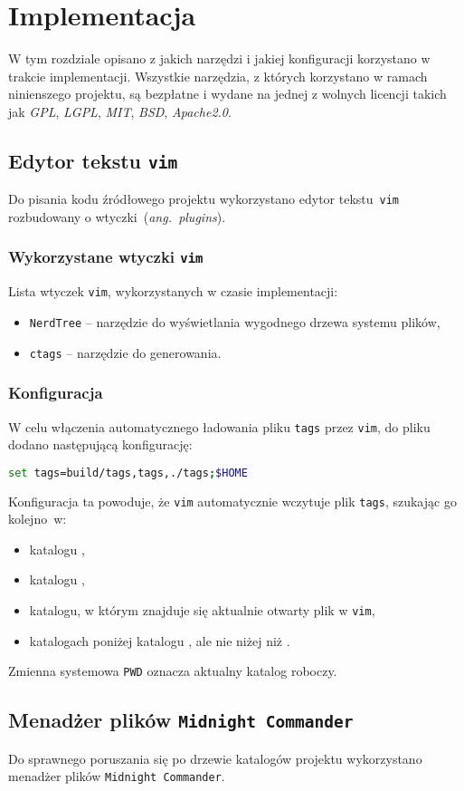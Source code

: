 \documentclass[praca_magisterska]{subfiles}
\begin{document}
\chapter{Implementacja}

W tym rozdziale opisano z jakich narzędzi i jakiej konfiguracji korzystano w trakcie implementacji. Wszystkie narzędzia, z których korzystano w ramach ninienszego projektu, są bezpłatne i wydane na jednej z wolnych licencji takich jak \emph{GPL}, \emph{LGPL}, \emph{MIT}, \emph{BSD}, \emph{Apache2.0}.

\section{Edytor tekstu \texttt{vim}}

Do pisania kodu źródłowego projektu wykorzystano edytor tekstu~\texttt{vim} rozbudowany o wtyczki~(\emph{ang.~plugins}).

\subsection{Wykorzystane wtyczki \texttt{vim}}

Lista wtyczek \texttt{vim}, wykorzystanych w czasie implementacji:
\begin{itemize}
	\item\texttt{NerdTree} -- narzędzie do wyświetlania wygodnego drzewa systemu plików,
	\item\texttt{ctags} -- narzędzie do generowania.
\end{itemize}

\subsection{Konfiguracja}

W celu włączenia automatycznego ładowania pliku \texttt{tags} przez \texttt{vim}, do pliku  dodano następującą konfigurację:
\begin{lstlisting}[language=bash,numbers=none,caption={Konfiguracja \texttt{~/.vimrc}}]
set tags=build/tags,tags,./tags;$HOME
\end{lstlisting}
Konfiguracja ta powoduje, że \texttt{vim} automatycznie wczytuje plik \texttt{tags}, szukając go kolejno~w:
\begin{itemize}[font=\ttfamily]
	\item katalogu ,
	\item katalogu ,
	\item katalogu, w którym znajduje się aktualnie otwarty plik w \texttt{vim},
	\item katalogach poniżej katalogu , ale nie niżej niż .
\end{itemize}
Zmienna systemowa \texttt{\gls{PWD}} oznacza aktualny katalog roboczy.

\section{Menadżer plików \texttt{Midnight Commander}}

Do sprawnego poruszania się po drzewie katalogów projektu wykorzystano menadżer plików \texttt{Midnight~Commander}.
\end{document}
